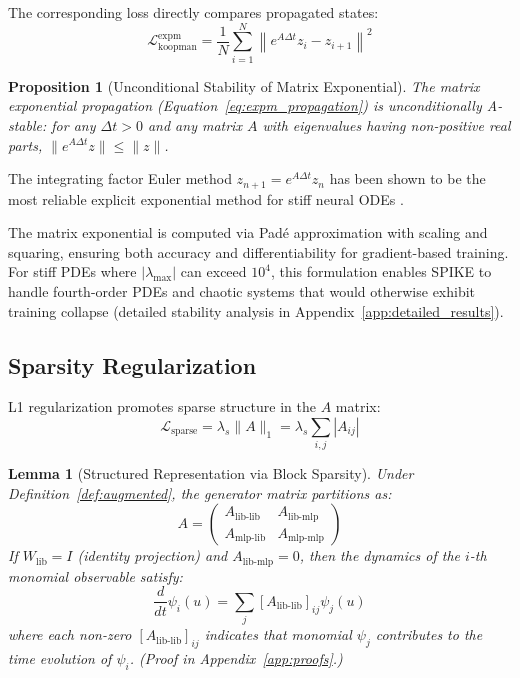 \documentclass{article}
\newtheorem{proposition}{Proposition}
\newtheorem{lemma}{Lemma}
\theoremstyle{remark}
\begin{document}
The corresponding loss directly compares propagated states:
\begin{equation}
\mathcal{L}_{\text{koopman}}^{\text{expm}} = \frac{1}{N}\sum_{i=1}^{N}\left\|e^{A\Delta t}z_i - z_{i+1}\right\|^2
\end{equation}

\begin{proposition}[Unconditional Stability of Matrix Exponential]
\label{prop:expm_stability}
The matrix exponential propagation (Equation~\ref{eq:expm_propagation}) is unconditionally A-stable: for any $\Delta t > 0$ and any matrix $A$ with eigenvalues having non-positive real parts, $\|e^{A\Delta t}z\| \leq \|z\|$.
\end{proposition}

The integrating factor Euler method $z_{n+1} = e^{A\Delta t}z_n$ has been shown to be the most reliable explicit exponential method for stiff neural ODEs \citep{garrido2024expintegrators}.

The matrix exponential is computed via Pad\'e approximation with scaling and squaring, ensuring both accuracy and differentiability for gradient-based training. For stiff PDEs where $|\lambda_{\max}|$ can exceed $10^4$, this formulation enables SPIKE to handle fourth-order PDEs and chaotic systems that would otherwise exhibit training collapse (detailed stability analysis in Appendix~\ref{app:detailed_results}).

\subsection{Sparsity Regularization}

L1 regularization promotes sparse structure in the $A$ matrix:
\begin{equation}
\mathcal{L}_{\text{sparse}} = \lambda_s \|A\|_1 = \lambda_s \sum_{i,j}|A_{ij}|
\end{equation}

\begin{lemma}[Structured Representation via Block Sparsity]
\label{lem:block_sparse}
Under Definition~\ref{def:augmented}, the generator matrix partitions as:
\begin{equation}
A = \begin{pmatrix} A_{\text{lib-lib}} & A_{\text{lib-mlp}} \\ A_{\text{mlp-lib}} & A_{\text{mlp-mlp}} \end{pmatrix}
\end{equation}
If $W_{\text{lib}} = I$ (identity projection) and $A_{\text{lib-mlp}} = 0$, then the dynamics of the $i$-th monomial observable satisfy:
\begin{equation}
\frac{d}{dt}\psi_i(u) = \sum_{j} [A_{\text{lib-lib}}]_{ij} \psi_j(u)
\label{eq:symbolic_dynamics}
\end{equation}
where each non-zero $[A_{\text{lib-lib}}]_{ij}$ indicates that monomial $\psi_j$ contributes to the time evolution of $\psi_i$. (Proof in Appendix~\ref{app:proofs}.)
\end{lemma}
\end{document}
